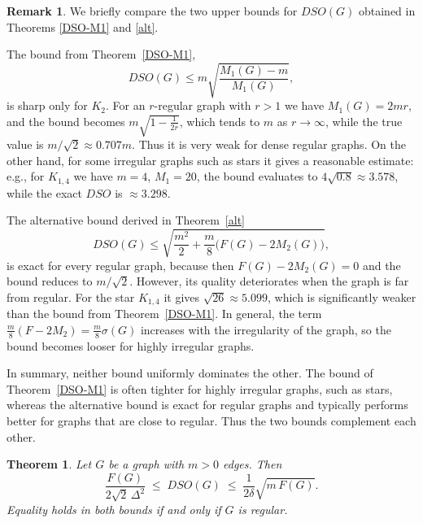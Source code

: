 \documentclass{article}
\newtheorem{theorem}{Theorem}
\theoremstyle{definition}
\newtheorem{remark}{Remark}
\begin{document}
\begin{remark}\label{rem:comparison-upper}
We briefly compare the two upper bounds for $DSO(G)$ obtained in Theorems \ref{DSO-M1} and \ref{alt}.

The bound from Theorem~\ref{DSO-M1},
\[
DSO(G)\le m\sqrt{\frac{M_1(G)-m}{M_1(G)}},
\]
is sharp only for $K_2$. For an $r$-regular graph with $r>1$ we have $M_1(G)=2mr$, and the bound becomes $m\sqrt{1-\frac{1}{2r}}$, which tends to $m$ as $r\to\infty$, while the true value is $m/\sqrt2\approx0.707m$. Thus it is very weak for dense regular graphs.
On the other hand, for some irregular graphs such as stars it gives a reasonable estimate: e.g., for $K_{1,4}$ we have $m=4$, $M_1=20$, the bound evaluates to $4\sqrt{0.8}\approx3.578$, while the exact $DSO$ is $\approx3.298$.

The alternative bound derived in Theorem~\ref{alt}
\[
DSO(G)\le\sqrt{\frac{m^2}{2}+\frac{m}{8}\bigl(F(G)-2M_2(G)\bigr)},
\]
is exact for every regular graph, because then
$F(G)-2M_2(G)=0$
and the bound reduces to $m/\sqrt2$.
However, its quality deteriorates when the graph is far from regular. For the star $K_{1,4}$ it gives $\sqrt{26}\approx5.099$, which is significantly weaker than the bound from Theorem~\ref{DSO-M1}.
In general, the term $\frac{m}{8}(F-2M_2)=\frac{m}{8}\sigma(G)$ increases with the irregularity of the graph, so the bound becomes looser for highly irregular graphs.

In summary, neither bound uniformly dominates the other.
The bound of Theorem~\ref{DSO-M1} is often tighter for highly irregular graphs,
such as stars, whereas the alternative bound is exact for regular graphs and
typically performs better for graphs that are close to regular.
Thus the two bounds complement each other.
\end{remark}

\begin{theorem}\label{DSO-F}
Let $G$ be a graph with $m>0$ edges.
Then
\[
\frac{F(G)}{2\sqrt{2}\,\Delta^{2}} \;\le\; DSO(G) \;\le\; \frac{1}{2\delta}\sqrt{m\,F(G)}.
\]
Equality holds in both bounds if and only if $G$ is regular.
\end{theorem}
\end{document}
